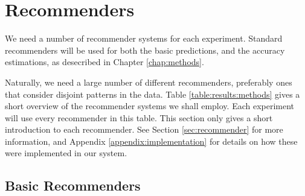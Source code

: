 \section{Recommenders}

We need a number of recommender systems for each experiment.
Standard recommenders will be used for both the basic predictions,
and the accuracy estimations,
as desecribed in Chapter \ref{chap:methods}.

Naturally, we need a large number of different recommenders, preferably ones that consider
disjoint patterns in the data. Table \ref{table:results:methods}
gives a short overview of the recommender systems we shall employ.
Each experiment will use every recommender in this table.
This section only gives a short introduction to each recommender.
See Section \ref{sec:recommender} for more information, 
and Appendix \ref{appendix:implementation} for details on how these were implemented in our system.


\subsection{Basic Recommenders}

